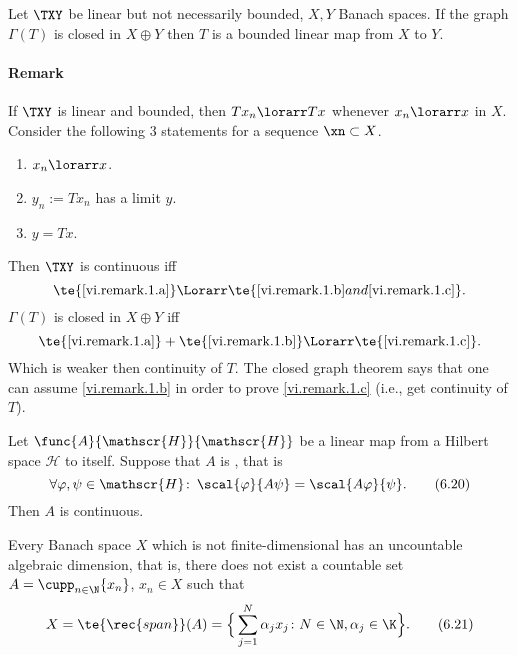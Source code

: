 \begin{thm}\label{vi.14}
    Let $\TXY$ be linear \rec{(}but not necessarily bounded\rec{)}, $X,Y$ Banach spaces. If the graph $\Gamma(T)$ is closed in $X\oplus Y$ then $T$ is a bounded linear map from $X$ to $Y$.
\end{thm}

\paragraph{Remark}
If $\TXY$ is linear and bounded, then $Tx_n\lorarr Tx$ whenever $x_n\lorarr x$ in $X$. Consider the following 3 statements for a sequence $\xn\subset X$.
\begin{enumerate}[label=\alph*)]
    \item $x_n\lorarr x$.\label{vi.remark.1.a}
    \item $y_n:=Tx_n$ has a limit $y$.\label{vi.remark.1.b}
    \item $y=Tx$.\label{vi.remark.1.c}
\end{enumerate}
Then $\TXY$ is continuous iff 
\[\te{\ref{vi.remark.1.a}}\Lorarr\te{\ref{vi.remark.1.b} and \ref{vi.remark.1.c}}.\]
$\Gamma(T)$ is closed in $X\oplus Y$ iff
\[\te{\ref{vi.remark.1.a}}+\te{\ref{vi.remark.1.b}}\Lorarr\te{\ref{vi.remark.1.c}}.\]
Which is  weaker then continuity of $T$. The closed graph theorem says that one can assume \ref{vi.remark.1.b} in order to prove \ref{vi.remark.1.c} (i.e., get continuity of $T$).

\renewcommand{\H}{\mathscr{H}}
\begin{cor}\label{vi.15}
    Let $\func{A}{\H}{\H}$ be a linear map from a Hilbert space $\H$ to itself. Suppose that $A$ is , that is
    \[\forall\varphi,\psi\in\H\colon\,\scal{\varphi}{A\psi}=\scal{A\varphi}{\psi}.\tag{6.20}\label{6.20}\]
    Then $A$ is continuous.
\end{cor}

\begin{thm}\label{vi.16}
    Every Banach space $X$ which is not finite-dimensional has an uncountable algebraic dimension, that is, there does not exist a countable set $A=\cupp_{n\in\N}\{x_n\}$, $x_n\in X$ such that
    \[X=\te{\rec{span}}(A)=\Big\{\sum_{j=1}^N\alpha_jx_j\colon N\in\N,\alpha_j\in\K\Big\}.\tag{6.21}\label{6.21}\]
\end{thm}